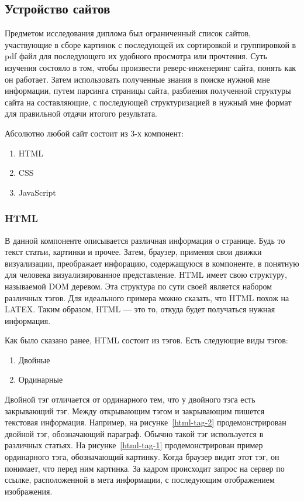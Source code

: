 \subsection{Устройство сайтов}
Предметом исследования диплома был ограниченный список сайтов,
участвующие в сборе картинок с последующей их сортировкой и группировкой в pdf файл для последующего их удобного просмотра или прочтения.
Суть изучения состояло в том, чтобы произвести реверс-инженеринг сайта, понять как он работает. 
Затем использовать полученные знания в поиске нужной мне информации, путем парсинга страницы сайта, разбиения полученной структуры сайта на составляющие,
с последующей структуризацией в нужный мне формат для правильной отдачи итогого результата.

Абсолютно любой сайт состоит из 3-х компонент:

\begin{enumerate}
    \item HTML
    \item CSS
    \item JavaScript
\end{enumerate}  

\subsubsection{HTML}
В данной компоненте описывается различная информация о странице. Будь то текст статьи, картинки и прочее.
Затем, браузер, применяя свои движки визуализации, преображает инфорацию, содержащуюся в компоненте, в понятную для человека визуализированное представление.
HTML имеет свою структуру, называемой DOM деревом. Эта структура по сути своей является набором различных тэгов.
Для идеального примера можно сказать, что HTML похож на LATEX. Таким образом, HTML --- это то, откуда будет получаться нужная информация.

Как было сказано ранее, HTML состоит из тэгов. Есть следующие виды тэгов:
\begin{enumerate}
    \item Двойные
    \item Ординарные
\end{enumerate} 

Двойной тэг отличается от ординарного тем, что у двойного тэга есть закрывающий тэг. Между открывающим тэгом и закрывающим пишется текстовая информация.
Например, на рисунке~\ref{html-tag-2} продемонстрирован двойной тэг, обозначающий параграф. Обычно такой тэг используется в различных статьях.
На рисунке~\ref{html-tag-1} продемонстрирован пример ординарного тэга, обозначающий картинку. Когда браузер видит этот тэг, он понимает, что перед ним картинка.
За кадром происходит запрос на сервер по ссылке, расположенной в мета информации, с последующим отображением изображения.

